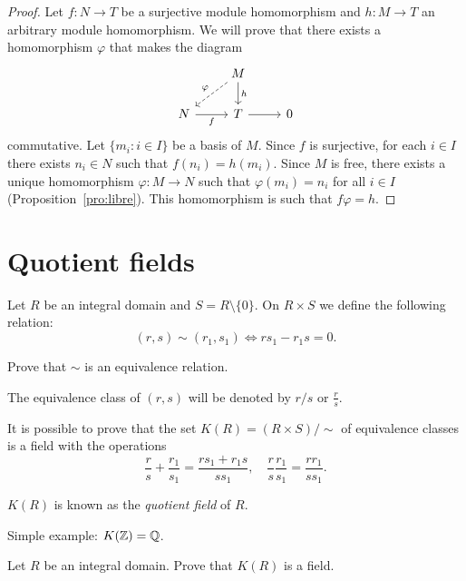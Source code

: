 \begin{proof}
   Let $f\colon N\to T$ be a surjective module homomorphism and 
   $h\colon M \to T$ an arbitrary module homomorphism. 
    We will prove that 
    there exists a homomorphism $\varphi$ that makes
    the diagram
    \[\begin{tikzcd}
	& M \\
	N & T & 0
	\arrow["f"', from=2-1, to=2-2]
	\arrow[from=2-2, to=2-3]
	\arrow["h", from=1-2, to=2-2]
	\arrow["\varphi"', dashed, from=1-2, to=2-1]
\end{tikzcd}\]
    commutative. 
	Let $\{m_i:i\in I\}$ be a basis of $M$. Since $f$ is surjective, for each
	$i\in I$ there exists $n_i\in N$ such that $f(n_i)=h(m_i)$. Since  $M$ is
	free, there exists a unique homomorphism $\varphi\colon M\to N$ such that
    $\varphi(m_i)=n_i$ for all $i\in I$ (Proposition~\ref{pro:libre}). This homomorphism is such that
	$f\varphi=h$. 
\end{proof}


\section{Quotient fields}

Let $R$ be an integral domain and $S=R\setminus\{0\}$. 
On $R\times S$ we define the following relation:
\[
(r,s)\sim (r_1,s_1)\Longleftrightarrow rs_1-r_1s=0.
\]

\begin{exercise}
Prove that $\sim$ is an equivalence relation.
\end{exercise}

The equivalence class of $(r,s)$ will be denoted by $r/s$ or $\frac{r}{s}$. 

It is possible to prove that the set 
$K(R)=(R\times S)/{\sim}$ of equivalence classes is a field 
with the operations 
\begin{equation}
\label{eq:K(R)}
\frac{r}{s}+\frac{r_1}{s_1}=\frac{rs_1+r_1s}{ss_1},
\quad
\frac{r}{s}\frac{r_1}{s_1}=\frac{rr_1}{ss_1}.
\end{equation}

\begin{definition}
$K(R)$ is known as the \emph{quotient field} of $R$. 
\end{definition}

Simple example: $K(\mathbb{Z})=\mathbb{Q}$.

\begin{exercise}
Let $R$ be an integral domain. 
Prove that $K(R)$ is a field. 
\end{exercise}

